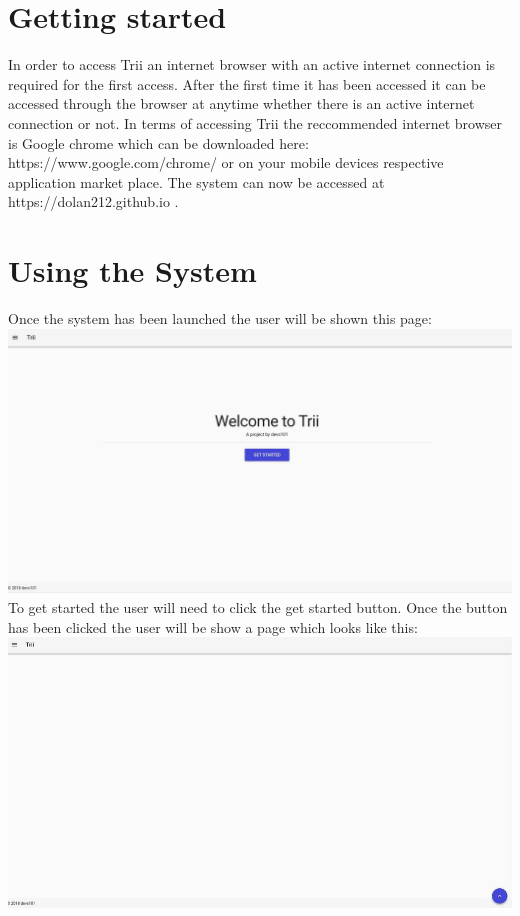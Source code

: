 \documentclass{article}
\begin{document}
\section{Getting started}
In order to access Trii an internet browser with an active internet connection is required for the first access. After the first time it has been accessed it can be accessed through the browser at anytime whether there is an active internet connection or not. In terms of accessing Trii the reccommended internet browser is Google chrome which can be downloaded here: https://www.google.com/chrome/ or on your mobile devices respective application market place. The system can now be accessed at https://dolan212.github.io .
\section{Using the System}
Once the system has been launched the user will be shown this page:\\
\includegraphics[scale=0.25]{landingpage}\\
To get started the user will need to click the get started button. Once the button has been clicked the user will be show a page which looks like this:\\
\includegraphics[scale=0.49]{treeView}\\
\end{document}
